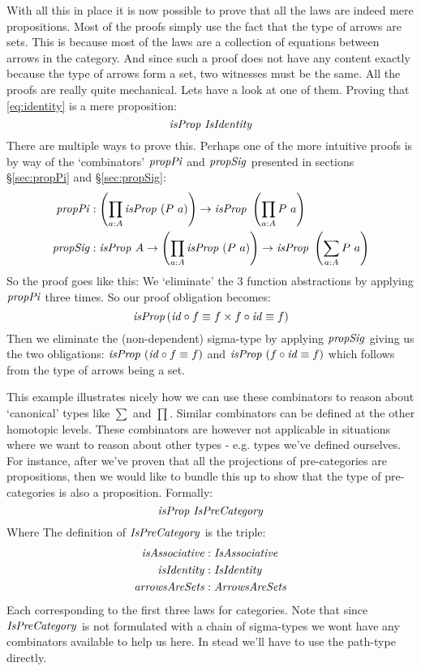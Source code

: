 With all this in place it is now possible to prove that all the laws are indeed
mere propositions. Most of the proofs simply use the fact that the type of
arrows are sets. This is because most of the laws are a collection of equations
between arrows in the category. And since such a proof does not have any content
exactly because the type of arrows form a set, two witnesses must be the same.
All the proofs are really quite mechanical. Lets have a look at one of them.
Proving that \ref{eq:identity} is a mere proposition:
%
\begin{equation}
  \isProp\ \var{IsIdentity}
\end{equation}
%
There are multiple ways to prove this. Perhaps one of the more intuitive proofs
is by way of the `combinators' $\propPi$ and $\propSig$ presented in sections
\S\ref{sec:propPi} and \S\ref{sec:propSig}:
%
\begin{align*}
\propPi & \tp \left(\prod_{a \tp A} \isProp\ (P\ a)\right) \to \isProp\ \left(\prod_{a \tp A} P\ a\right)
  \\
\propSig & \tp \isProp\ A \to \left(\prod_{a \tp A} \isProp\ (P\ a)\right) \to \isProp\ \left(\sum_{a \tp A} P\ a\right)
\end{align*}
%
So the proof goes like this: We `eliminate' the 3 function abstractions by
applying $\propPi$ three times. So our proof obligation becomes:
%
$$
\isProp \left( \id \comp f \equiv f \x f \comp \id \equiv f \right)
$$
%
Then we eliminate the (non-dependent) sigma-type by applying $\propSig$ giving
us the two obligations: $\isProp\ (\id \comp f \equiv f)$ and $\isProp\ (f \comp
\id \equiv f)$ which follows from the type of arrows being a
set.

This example illustrates nicely how we can use these combinators to reason about
`canonical' types like $\sum$ and $\prod$. Similar combinators can be defined
at the other homotopic levels. These combinators are however not applicable in
situations where we want to reason about other types - e.g. types we've defined
ourselves. For instance, after we've proven that all the projections of
pre-categories are propositions, then we would like to bundle this up to show
that the type of pre-categories is also a proposition. Formally:
%
\begin{equation}
\label{eq:propIsPreCategory}
\isProp\ \IsPreCategory
\end{equation}
%
Where The definition of $\IsPreCategory$ is the triple:
%
\begin{align*}
\var{isAssociative} & \tp \var{IsAssociative}\\
\isIdentity    & \tp \var{IsIdentity}\\
\var{arrowsAreSets} & \tp \var{ArrowsAreSets}
\end{align*}
%
Each corresponding to the first three laws for categories. Note that since
$\IsPreCategory$ is not formulated with a chain of sigma-types we wont have any
combinators available to help us here. In stead we'll have to use the path-type
directly.

